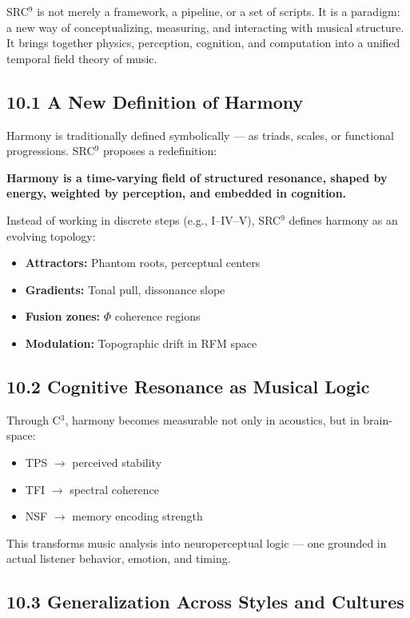 SRC$^{9}$ is not merely a framework, a pipeline, or a set of scripts. It is a paradigm: a new way of conceptualizing, measuring, and interacting with musical structure. It brings together physics, perception, cognition, and computation into a unified temporal field theory of music.

\subsection*{10.1 A New Definition of Harmony}

Harmony is traditionally defined symbolically — as triads, scales, or functional progressions. SRC$^{9}$ proposes a redefinition:

\textbf{Harmony is a time-varying field of structured resonance, shaped by energy, weighted by perception, and embedded in cognition.}

Instead of working in discrete steps (e.g., I–IV–V), SRC$^{9}$ defines harmony as an evolving topology:

\begin{itemize}
    \item \textbf{Attractors:} Phantom roots, perceptual centers
    \item \textbf{Gradients:} Tonal pull, dissonance slope
    \item \textbf{Fusion zones:} $\Phi$ coherence regions
    \item \textbf{Modulation:} Topographic drift in RFM space
\end{itemize}

\subsection*{10.2 Cognitive Resonance as Musical Logic}

Through C$^{3}$, harmony becomes measurable not only in acoustics, but in brain-space:

\begin{itemize}
    \item TPS $\rightarrow$ perceived stability
    \item TFI $\rightarrow$ spectral coherence
    \item NSF $\rightarrow$ memory encoding strength
\end{itemize}

This transforms music analysis into neuroperceptual logic — one grounded in actual listener behavior, emotion, and timing.

\subsection*{10.3 Generalization Across Styles and Cultures}

